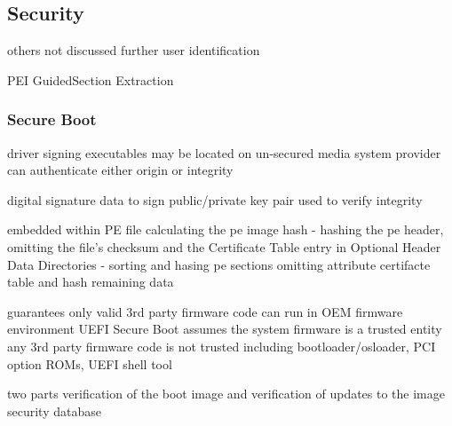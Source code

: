 
\subsection{Security}

others not discussed further
user identification

PEI
GuidedSection Extraction


\subsubsection{Secure Boot}

\cite{tianocore-understanding-uefi-secure-boot-chain}

driver signing
executables may be located on un-secured media
system provider can authenticate either origin or integrity

digital signature
data to sign
public/private key pair used to verify integrity


embedded within PE file
calculating the pe image hash
- hashing the pe header, omitting the file's checksum and the Certificate Table entry in Optional Header Data Directories
- sorting and hasing pe sections
omitting attribute certifacte table and hash remaining data

\cite{microsoft-pe-signature-format}




guarantees only valid 3rd party firmware code can run in OEM firmware environment
UEFI Secure Boot assumes the system firmware is a trusted entity
any 3rd party firmware code is not trusted
including bootloader/osloader, PCI option ROMs, UEFI shell tool

two parts
verification of the boot image and verification of updates to the image security database
\cite{understanding-uefi-secure-boot-chain}



